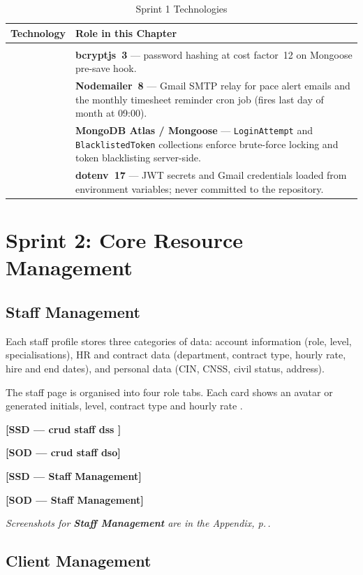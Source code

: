 \documentclass[12pt,a4paper]{report}
\newcommand{\ssd}[1]{\begin{placeholder}\textbf{[SSD --- #1]}\end{placeholder}\vspace{2pt}}
\newcommand{\sod}[1]{\begin{placeholder}\textbf{[SOD --- #1]}\end{placeholder}\vspace{4pt}}
\newcommand{\annexref}[1]{\begin{screenshotbox}\small\textit{Screenshots for \textbf{#1} are in the Appendix, p.\,\pageref{annex:#1}.}\end{screenshotbox}\vspace{4pt}}
\newcommand{\logoplace}[1]{%
  \begin{tikzpicture}[baseline=-0.5ex]
    \node[fill=logobg, draw=logoborder, rounded corners=4pt,
          inner xsep=6pt, inner ysep=4pt,
          minimum width=2.4cm, minimum height=0.75cm,
          font=\bfseries\footnotesize\color{accentgray}] {#1};
  \end{tikzpicture}%
}
\newenvironment{techtable}[2]{%
  \begin{longtable}{>{\centering\arraybackslash}p{2.6cm} p{11cm}}
  \caption{#1}\label{#2}\\
  \toprule\textbf{Technology} & \textbf{Role in this Chapter}\\\midrule\endhead
  \midrule\multicolumn{2}{r}{\small\itshape Continued\ldots}\\\endfoot
  \bottomrule\endlastfoot
}{%
  \end{longtable}%
}
\begin{document}
\begin{techtable}{Sprint 1 Technologies}{tab:tech-sprint1}
  \logoplace{bcryptjs 3} &
  \textbf{bcryptjs~3} --- password hashing at cost factor~12 on Mongoose pre-save hook.\\[6pt]

  \logoplace{Nodemailer 8} &
  \textbf{Nodemailer~8} --- Gmail SMTP relay for pace alert emails and the monthly
  timesheet reminder cron job (fires last day of month at 09:00).\\[6pt]

  \logoplace{MongoDB Atlas} &
  \textbf{MongoDB Atlas / Mongoose} --- \texttt{LoginAttempt} and \texttt{BlacklistedToken}
  collections enforce brute-force locking and token blacklisting server-side.\\[6pt]

  \logoplace{dotenv 17} &
  \textbf{dotenv~17} --- JWT secrets and Gmail credentials loaded from environment
  variables; never committed to the repository.\\

\end{techtable}

\chapter{Sprint 2: Core Resource Management}

\section{Staff Management}

Each staff profile stores three categories of data: account information (role, level,
specialisations), HR and contract data (department, contract type, hourly rate, hire
and end dates), and personal data (CIN, CNSS, civil status, address).

The staff page is organised into four role tabs. Each card shows an avatar or
generated initials, level, contract type and hourly rate .

\ssd{crud staff dss }
\sod{crud staff dso}
\ssd{Staff Management}
\sod{Staff Management}
\annexref{Staff Management}

\section{Client Management}
\end{document}
